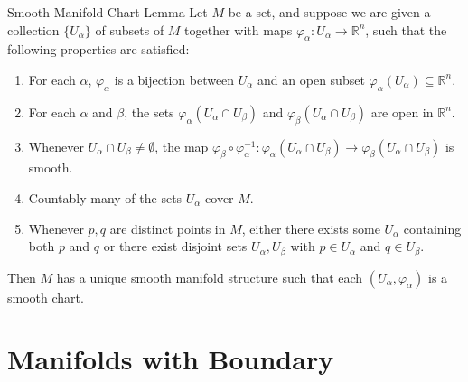 \documentclass[../main.tex]{subfiles}
\begin{document}
\begin{lemma}{Smooth Manifold Chart Lemma}{}
Let $M$ be a set, and suppose we are given a collection $\{U_\alpha\}$ of subsets of $M$ together with maps $\varphi_\alpha : U_\alpha \to \mathbb{R}^n$, such that the following properties are satisfied:
\begin{enumerate}
    \item For each $\alpha$, $\varphi_\alpha$ is a bijection between $U_\alpha$ and an open subset $\varphi_\alpha(U_\alpha) \subseteq \mathbb{R}^n$.
    \item For each $\alpha$ and $\beta$, the sets $\varphi_\alpha(U_\alpha \cap U_\beta)$ and $\varphi_\beta(U_\alpha \cap U_\beta)$ are open in $\mathbb{R}^n$.
    \item Whenever $U_\alpha \cap U_\beta \neq \emptyset$, the map $\varphi_\beta \circ \varphi_\alpha^{-1} : \varphi_\alpha(U_\alpha \cap U_\beta) \to \varphi_\beta(U_\alpha \cap U_\beta)$ is smooth.
    \item Countably many of the sets $U_\alpha$ cover $M$.
    \item Whenever $p, q$ are distinct points in $M$, either there exists some $U_\alpha$ containing both $p$ and $q$ or there exist disjoint sets $U_\alpha, U_\beta$ with $p \in U_\alpha$ and $q \in U_\beta$.
\end{enumerate}
Then $M$ has a unique smooth manifold structure such that each $(U_\alpha, \varphi_\alpha)$ is a smooth chart.
\end{lemma}
\section{Manifolds with Boundary}
\end{document}
